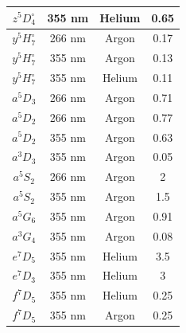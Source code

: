 \documentclass[12pt,twoside]{reedthesis}
\begin{document}
\begin{longtable}{||c|c|c|c||}
	$z^{5}D^{\circ}_{4}$ & 355 nm           & Helium     & 0.65                                                      \\\hline
	$y^{5}H^{\circ}_{7}$ & 266 nm           & Argon      & 0.17                                                      \\\hline
	$y^{5}H^{\circ}_{7}$ & 355 nm           & Argon      & 0.13                                                      \\\hline
	$y^{5}H^{\circ}_{7}$ & 355 nm           & Helium     & 0.11                                                      \\\hline
	$a^{5}D_{3}$         & 266 nm           & Argon      & 0.71                                                      \\\hline
	$a^{5}D_{2}$         & 266 nm           & Argon      & 0.77                                                      \\\hline
	$a^{5}D_{2}$         & 355 nm           & Argon      & 0.63                                                      \\\hline
	$a^{3}D_{3}$         & 355 nm           & Argon      & 0.05                                                      \\\hline
	$a^{5}S_{2}$         & 266 nm           & Argon      & 2                                                         \\\hline
	$a^{5}S_{2}$         & 355 nm           & Argon      & 1.5                                                       \\\hline
	$a^{5}G_{6}$         & 355 nm           & Argon      & 0.91                                                      \\\hline
	$a^{3}G_{4}$         & 355 nm           & Argon      & 0.08                                                      \\\hline
	$e^{7}D_{5}$         & 355 nm           & Helium     & 3.5                                                       \\\hline
	$e^{7}D_{3}$         & 355 nm           & Helium     & 3                                                         \\\hline
	$f^{7}D_{5}$         & 355 nm           & Helium     & 0.25                                                      \\\hline
	$f^{7}D_{5}$         & 355 nm           & Argon      & 0.25                                                      \\\hline

\end{longtable}
\end{document}
